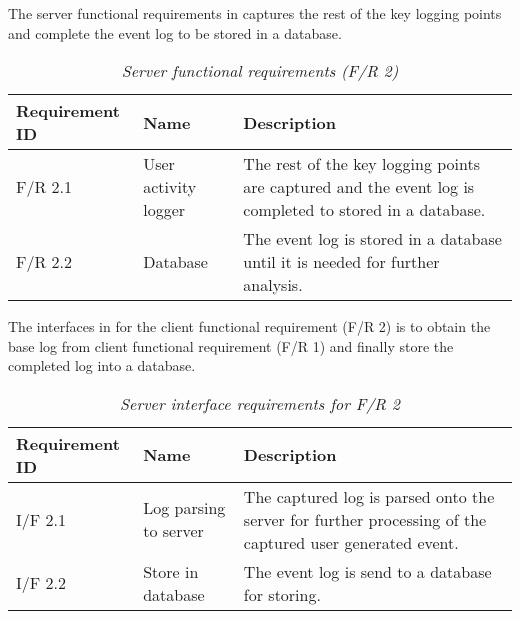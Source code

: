 The server functional requirements in  captures the rest of the key logging points and complete the event log to be stored in a database. 

\begin{table}[!htb]
	\centering
	\small
	\caption[Server functional requirements]
	{\textit{Server functional requirements (F/R 2)}}
	\label{tbl:Ch2_Server_Functional_Requirements}
	\begin{tabularx}{\textwidth}{|l|l|X|}
		\hline \textbf{Requirement ID} & \textbf{Name} & \textbf{Description} \\
		\hline F/R 2.1 & User activity logger & The rest of the key logging points are captured and the event log is completed to stored in a database.\\
		\hline F/R 2.2 & Database & The event log is stored in a database until it is needed for further analysis.\\
		\hline
	\end{tabularx}
\end{table}

The interfaces in  for the client functional requirement (F/R 2) is to obtain the base log from client functional requirement (F/R 1) and finally store the completed log into a database.

\begin{table}[!htb]
	\centering
	\small
	\caption[Server interface requirements]
	{\textit{Server interface requirements for F/R 2}}
	\label{tbl:Ch2_Server_Interface_Requirements}
	\begin{tabularx}{\textwidth}{|l|l|X|}
		\hline \textbf{Requirement ID} & \textbf{Name} & \textbf{Description} \\
		\hline I/F 2.1 & Log parsing to server & The captured log is parsed onto the server for further processing of the captured user generated event.\\
		\hline I/F 2.2 & Store in database & The event log is send to a database for storing.\\
		\hline
	\end{tabularx}
\end{table}

\clearpage

